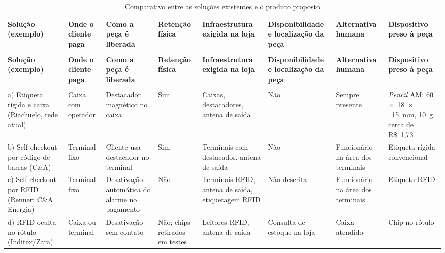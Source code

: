 \begin{landscape}
\footnotesize
\setlength{\tabcolsep}{4pt}
\renewcommand{\arraystretch}{1.25}
\begin{longtable}{
  >{\raggedright\arraybackslash}p{3.0cm}
  >{\raggedright\arraybackslash}p{2.2cm}
  >{\raggedright\arraybackslash}p{2.8cm}
  >{\raggedright\arraybackslash}p{2.3cm}
  >{\raggedright\arraybackslash}p{3.2cm}
  >{\raggedright\arraybackslash}p{2.8cm}
  >{\raggedright\arraybackslash}p{2.6cm}
  >{\raggedright\arraybackslash}p{3.1cm}}
\caption{Comparativo entre as soluções existentes e o produto proposto}
\label{tab:comparativo-solucoes} \\
\toprule
\textbf{Solução (exemplo)} & \textbf{Onde o cliente paga} & \textbf{Como a peça é liberada} & \textbf{Retenção física} & \textbf{Infraestrutura exigida na loja} & \textbf{Disponibilidade e localização da peça} & \textbf{Alternativa humana} & \textbf{Dispositivo preso à peça} \\
\midrule
\endfirsthead
\multicolumn{8}{l}{\textit{Tabela~\thetable\ (continuação)}} \\
\toprule
\textbf{Solução (exemplo)} & \textbf{Onde o cliente paga} & \textbf{Como a peça é liberada} & \textbf{Retenção física} & \textbf{Infraestrutura exigida na loja} & \textbf{Disponibilidade e localização da peça} & \textbf{Alternativa humana} & \textbf{Dispositivo preso à peça} \\
\midrule
\endhead
\midrule
\multicolumn{8}{r}{\textit{continua na próxima página}} \\
\endfoot
\bottomrule
\endlastfoot
a) Etiqueta rígida e caixa (Riachuelo, rede atual) & Caixa com operador & Destacador magnético no caixa & Sim & Caixas, destacadores, antena de saída & Não & Sempre presente & \textit{Pencil} AM: 60~$\times$~18~$\times$~15~mm, 10~g, cerca de R\$~1,73 \\
b) Self-checkout por código de barras (C\&A) & Terminal fixo & Cliente usa destacador no terminal & Sim & Terminais com destacador, antena de saída & Não & Funcionário na área dos terminais & Etiqueta rígida convencional \\
c) Self-checkout por RFID (Renner; C\&A Energia) & Terminal fixo & Desativação automática do alarme no pagamento & Não & Terminais RFID, antena de saída, etiquetagem RFID & Não descrita & Funcionário na área dos terminais & Etiqueta RFID \\
d) RFID oculta no rótulo (Inditex/Zara) & Caixa ou terminal & Desativação sem contato & Não; chips retirados em testes & Leitores RFID, antena de saída & Consulta de estoque na loja & Caixa atendido & Chip no rótulo \\

\end{longtable}
\end{landscape}
